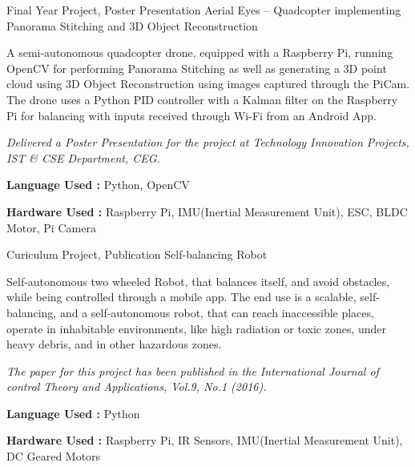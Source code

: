 

\begin{cventries}
  \cventry
    {Final Year Project, Poster Presentation} %
    {Aerial Eyes – Quadcopter implementing Panorama Stitching and 3D Object Reconstruction} %
    {} %
    {} %
    {
      \begin{cvitems}
      \item{A semi-autonomous quadcopter drone, equipped with a Raspberry Pi, running OpenCV for performing Panorama Stitching as well as generating a 3D point cloud using 3D Object Reconstruction using images captured through the PiCam. The drone uses a Python PID controller with a Kalman filter on the Raspberry Pi for balancing with inputs received through Wi-Fi from an Android App. }
      \item{\textit{Delivered a Poster Presentation for the project at Technology Innovation Projects, IST \& CSE Department, CEG.}}
      \item{\textbf{Language Used :} Python, OpenCV}
      \item{\textbf{Hardware Used :} Raspberry Pi, IMU(Inertial Measurement Unit), ESC, BLDC Motor, Pi Camera}
      \end{cvitems}
    }
  \cventry
    {Curiculum Project, Publication} %
    {Self-balancing Robot} %
    {} %
    {} %
    {
      \begin{cvitems}
      \item{Self-autonomous two wheeled Robot, that balances itself, and avoid obstacles, while being controlled through a mobile app. The end use is a scalable, self-balancing, and a self-autonomous robot, that can reach inaccessible places, operate in inhabitable environments, like high radiation or toxic zones, under heavy debris, and in other hazardous zones.}
      \item{\textit{The paper for this project has been published in the International Journal of control Theory and Applications, Vol.9, No.1 (2016).}}
      \item{\textbf{Language Used :} Python}
      \item{\textbf{Hardware Used :} Raspberry Pi, IR Sensors, IMU(Inertial Measurement Unit), DC Geared Motors}
      \end{cvitems}
    }


\end{cventries}
